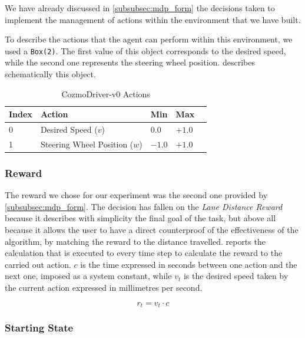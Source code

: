We have already discussed in \vref{subsubsec:mdp_form} the decisions taken to implement the management of actions within the environment that we have built.

To describe the actions that the agent can perform within this environment, we used a \texttt{Box(2)}.
The first value of this object corresponds to the desired speed, while the second one represents the steering wheel position.
 describes schematically this object.

\begin{table}[!h]
    \centering
    \caption{CozmoDriver-v0 Actions}
    \label{table:cozmo_actions}
    \begin{tabular}{@{}lllll@{}}
        \toprule
        Index & Action                        & Min    & Max    \\ \midrule
        0     & Desired Speed ($v$)           & $0.0$  & $+1.0$ \\
        1     & Steering Wheel Position ($w$) & $-1.0$ & $+1.0$ \\

        \bottomrule
    \end{tabular}
\end{table}

\subsubsection{Reward}

The reward we chose for our experiment was the second one provided by \vref{subsubsec:mdp_form}.
The decision has fallen on the \textit{Lane Distance Reward} because it describes with simplicity the final goal of the task, but above all because it allows the user to have a direct counterproof of the effectiveness of the algorithm, by matching the reward to the distance travelled.
 reports the calculation that is executed to every time step to calculate the reward to the carried out action.
$c$ is the time expressed in seconds between one action and the next one, imposed as a system constant, while $v_t$ is the desired speed taken by the current action expressed in millimetres per second.

\begin{equation}
    \label{eq:reward_fun}
    r_t = v_t \cdot c
\end{equation}

\subsubsection{Starting State}

